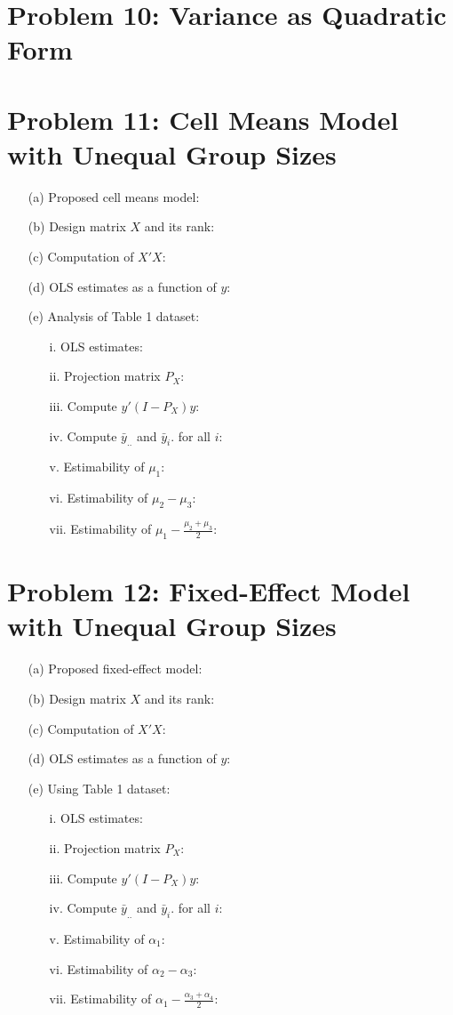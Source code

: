 \documentclass[10pt, oneside]{article}
\begin{document}
\section*{Problem 10: Variance as Quadratic Form}

\section*{Problem 11: Cell Means Model with Unequal Group Sizes}
\begin{itemize}
	\item[(a)] Proposed cell means model:
	\item[(b)] Design matrix $X$ and its rank:
	\item[(c)] Computation of $X'X$:
	\item[(d)] OLS estimates as a function of $y$:
	\item[(e)] Analysis of Table 1 dataset:
	\begin{itemize}
		\item[i.] OLS estimates:
		\item[ii.] Projection matrix $P_X$:
		\item[iii.] Compute $y'(I - P_X)y$:
		\item[iv.] Compute $\bar{y}_{..}$ and $\bar{y}_i.$ for all $i$:
		\item[v.] Estimability of $\mu_1$:
		\item[vi.] Estimability of $\mu_2 - \mu_3$:
		\item[vii.] Estimability of $\mu_1 - \frac{\mu_2 + \mu_3}{2}$:
	\end{itemize}
\end{itemize}

\section*{Problem 12: Fixed-Effect Model with Unequal Group Sizes}
\begin{itemize}
	\item[(a)] Proposed fixed-effect model:
	\item[(b)] Design matrix $X$ and its rank:
	\item[(c)] Computation of $X'X$:
	\item[(d)] OLS estimates as a function of $y$:
	\item[(e)] Using Table 1 dataset:
	\begin{itemize}
		\item[i.] OLS estimates:
		\item[ii.] Projection matrix $P_X$:
		\item[iii.] Compute $y'(I - P_X)y$:
		\item[iv.] Compute $\bar{y}_{..}$ and $\bar{y}_i.$ for all $i$:
		\item[v.] Estimability of $\alpha_1$:
		\item[vi.] Estimability of $\alpha_2 - \alpha_3$:
		\item[vii.] Estimability of $\alpha_1 - \frac{\alpha_3 + \alpha_4}{2}$:
	\end{itemize}
\end{itemize}
\end{document}
